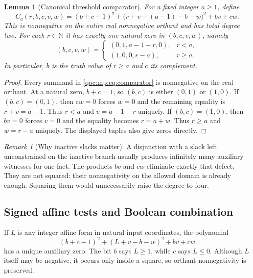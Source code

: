 \documentclass[11pt,letterpaper]{article}
\newtheorem{lemma}[theorem]{Lemma}
\theoremstyle{definition}
\theoremstyle{remark}
\newtheorem{remark}[theorem]{Remark}
\newcommand{\N}{\mathbb N}
\begin{document}
\begin{lemma}[Canonical threshold comparator]\label{qoc:mp:lem:comparator}
For a fixed integer $a\ge1$, define
\begin{equation}\label{qoc:mp:eq:comparator}
 C_a(r;b,c,v,w)
 =(b+c-1)^2+\bigl(r+v-(a-1)-b-w\bigr)^2+bv+cw.
\end{equation}
This is nonnegative on the entire real nonnegative orthant and has total
degree two. For each $r\in\N$ it has exactly one natural zero in
$(b,c,v,w)$, namely
\begin{equation}\label{qoc:mp:eq:comparatorwitness}
 (b,c,v,w)=
 \begin{cases}
 (0,1,a-1-r,0),&r<a,\\
 (1,0,0,r-a),&r\ge a.
 \end{cases}
\end{equation}
In particular, $b$ is the truth value of $r\ge a$ and $c$ its complement.
\end{lemma}
\begin{proof}
Every summand in \eqref{qoc:mp:eq:comparator} is nonnegative on the real orthant.
At a natural zero, $b+c=1$, so $(b,c)$ is either $(0,1)$ or $(1,0)$.
If $(b,c)=(0,1)$, then $cw=0$ forces $w=0$ and the remaining equality is
$r+v=a-1$. Thus $r<a$ and $v=a-1-r$ uniquely. If $(b,c)=(1,0)$, then
$bv=0$ forces $v=0$ and the equality becomes $r=a+w$. Thus $r\ge a$ and
$w=r-a$ uniquely. The displayed tuples also give zeros directly.
\end{proof}

\begin{remark}[Why inactive slacks matter]
A disjunction with a slack left unconstrained on the inactive branch
usually produces infinitely many auxiliary witnesses for one fact.
The products $bv$ and $cw$ eliminate exactly that defect. They are not
squared: their nonnegativity on the allowed domain is already enough.
Squaring them would unnecessarily raise the degree to four.
\end{remark}

\subsection{Signed affine tests and Boolean combination}
If $L$ is any integer affine form in natural input coordinates, the
polynomial
\begin{equation}\label{qoc:mp:eq:signed}
 (b+c-1)^2+(L+v-b-w)^2+bv+cw
\end{equation}
has a unique auxiliary zero. The bit $b$ says $L\ge1$, while $c$ says
$L\le0$. Although $L$ itself may be negative, it occurs only inside a
square, so orthant nonnegativity is preserved.
\end{document}
